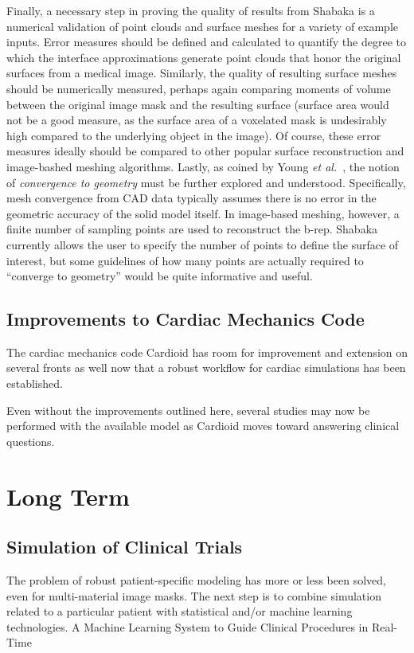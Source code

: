 Finally, a necessary step in proving the quality of results from Shabaka is a numerical validation of point clouds and surface meshes for a variety of example inputs. Error measures should be defined and calculated to quantify the degree to which the interface approximations generate point clouds that honor the original surfaces from a medical image. Similarly, the quality of resulting surface meshes should be numerically measured, perhaps again comparing moments of volume between the original image mask and the resulting surface (surface area would not be a good measure, as the surface area of a voxelated mask is undesirably high compared to the underlying object in the image). Of course, these error measures ideally should be compared to other popular surface reconstruction and image-bashed meshing algorithms. Lastly, as coined by Young \textit{et al.}~\cite{young_2008}, the notion of \textit{convergence to geometry} must be further explored and understood. Specifically, mesh convergence from CAD data typically assumes there is no error in the geometric accuracy of the solid model itself. In image-based meshing, however, a finite number of sampling points are used to reconstruct the b-rep. Shabaka currently allows the user to specify the number of points to define the surface of interest, but some guidelines of how many points are actually required to ``converge to geometry'' would be quite informative and useful.

\subsection{Improvements to Cardiac Mechanics Code}
\label{Improvements to Cardiac Mechanics Code}

The cardiac mechanics code Cardioid has room for improvement and extension on several fronts as well now that a robust workflow for cardiac simulations has been established.

\cite{yang_2012, zhukov_2003}

Even without the improvements outlined here, several studies may now be performed with the available model as Cardioid moves toward answering clinical questions.

\section{Long Term}
\label{Long Term}

\subsection{Simulation of Clinical Trials}
\label{Simulation of Clinical Trials}
The problem of robust patient-specific modeling has more or less been solved, even for multi-material image masks. The next step is to combine simulation related to a particular patient with statistical and/or machine learning technologies. 
A Machine Learning System to Guide Clinical Procedures in Real-Time

